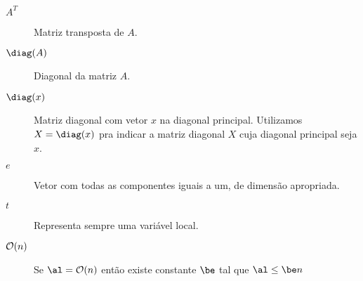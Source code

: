 \begin{description}
    \item[$A^T$] Matriz transposta de $A$.

    \item[$\diag(A)$] Diagonal da matriz $A$.

    \item[$\diag(x)$] Matriz diagonal com vetor $x$ na diagonal principal. Utilizamos $X = \diag(x)$ pra indicar a matriz diagonal $X$ cuja diagonal principal seja $x$.
 
    \item[$e$] Vetor com todas as componentes iguais a um, de dimensão apropriada.

    \item[$t$] Representa sempre uma variável local.


    \item[$\mathcal{O}(n)$] Se $\al = \Oset(n)$ então existe constante $\be$ tal que $\al \leq \be n$

\end{description}
